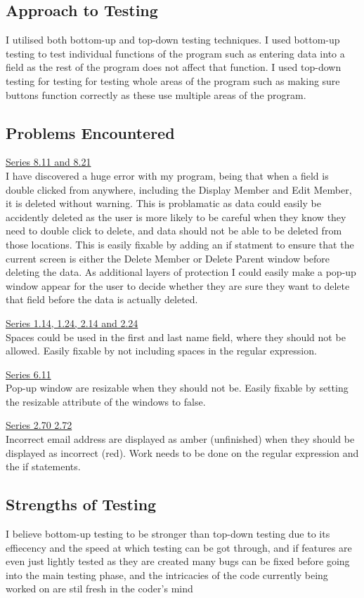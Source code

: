 \subsection{Approach to Testing}
I utilised both bottom-up and top-down testing techniques. I used bottom-up testing to test individual functions of the program such as entering data into a field as the rest of the program does not affect that function. I used top-down testing for testing for testing whole areas of the program such as making sure buttons function correctly as these use multiple areas of the program.

\subsection{Problems Encountered}

\underline{Series 8.11 and 8.21} \\
I have discovered a huge error with my program, being that when a field is double clicked from anywhere, including the Display Member and Edit Member, it is deleted without warning. This is problamatic as data could easily be accidently deleted as the user is more likely to be careful when they know they need to double click to delete, and data should not be able to be deleted from those locations. This is easily fixable by adding an if statment to ensure that the current screen is either the Delete Member or Delete Parent window before deleting the data.  As additional layers of protection I could easily make a pop-up window appear for the user to decide whether they are sure they want to delete that field before the data is actually deleted.

\underline{Series 1.14, 1.24, 2.14 and 2.24} \\
Spaces could be used in the first and last name field, where they should not be allowed. Easily fixable by not including spaces in the regular expression.

\underline{Series 6.11} \\
Pop-up window are resizable when they should not be. Easily fixable by setting the resizable attribute of the windows to false.

\underline{Series 2.70 2.72} \\
Incorrect email address are displayed as amber (unfinished) when they should be displayed as incorrect (red). Work needs to be done on the regular expression and the if statements.

\subsection{Strengths of Testing}
I believe bottom-up testing to be stronger than top-down testing due to its effiecency and the speed at which testing can be got through, and if features are even just lightly tested as they are created many bugs can be fixed before going into the main testing phase, and the intricacies of the code currently being worked on are stil fresh in the coder's mind

